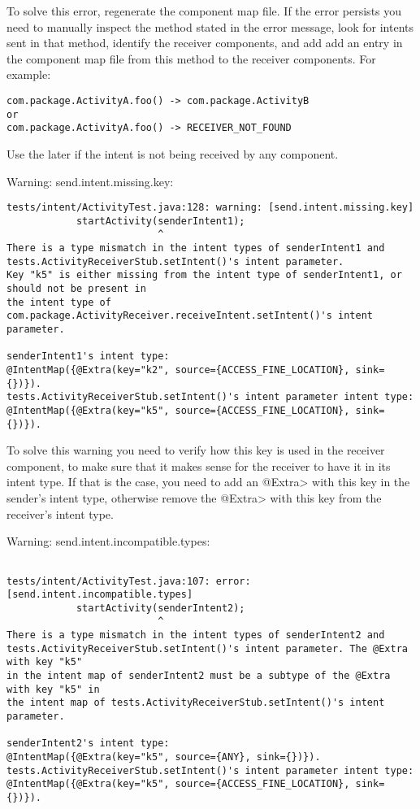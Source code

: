 To solve this error, regenerate the component map file. If the error
persists you need to manually inspect the method stated in the error message,
look for intents sent in that method, identify the receiver components, and add
add an entry in the component map file from this method to the receiver
components. For example:

\begin{Verbatim}
com.package.ActivityA.foo() -> com.package.ActivityB
or
com.package.ActivityA.foo() -> RECEIVER_NOT_FOUND
\end{Verbatim}

Use the later if the intent is not being received by any component.

\bigskip
\noindent
Warning: send.intent.missing.key:

\begin{Verbatim}
tests/intent/ActivityTest.java:128: warning: [send.intent.missing.key] 
            startActivity(senderIntent1);
                          ^
There is a type mismatch in the intent types of senderIntent1 and
tests.ActivityReceiverStub.setIntent()'s intent parameter.
Key "k5" is either missing from the intent type of senderIntent1, or should not be present in
the intent type of com.package.ActivityReceiver.receiveIntent.setIntent()'s intent parameter.

senderIntent1's intent type:
@IntentMap({@Extra(key="k2", source={ACCESS_FINE_LOCATION}, sink={})}).
tests.ActivityReceiverStub.setIntent()'s intent parameter intent type:
@IntentMap({@Extra(key="k5", source={ACCESS_FINE_LOCATION}, sink={})}).
\end{Verbatim}

To solve this warning you need to verify how this key is used in the receiver
component, to make sure that it makes sense for the receiver to have it in its
intent type. If that is the case, you need to add an \<@Extra> with this key in the
sender's intent type, otherwise remove the \<@Extra> with this key from the
receiver's intent type.

\bigskip
\noindent
Warning: send.intent.incompatible.types:

\begin{Verbatim}

tests/intent/ActivityTest.java:107: error: [send.intent.incompatible.types] 
            startActivity(senderIntent2);
                          ^
There is a type mismatch in the intent types of senderIntent2 and
tests.ActivityReceiverStub.setIntent()'s intent parameter. The @Extra with key "k5"
in the intent map of senderIntent2 must be a subtype of the @Extra with key "k5" in
the intent map of tests.ActivityReceiverStub.setIntent()'s intent parameter.

senderIntent2's intent type:
@IntentMap({@Extra(key="k5", source={ANY}, sink={})}).
tests.ActivityReceiverStub.setIntent()'s intent parameter intent type:
@IntentMap({@Extra(key="k5", source={ACCESS_FINE_LOCATION}, sink={})}).

\end{Verbatim}

